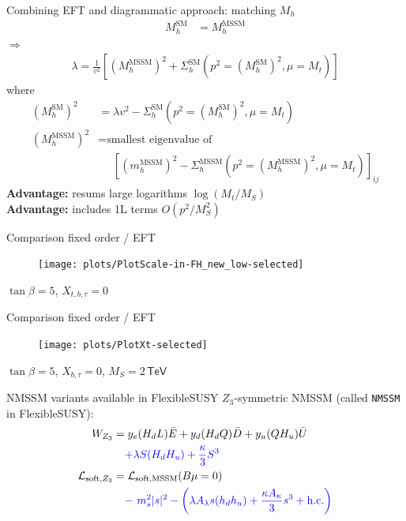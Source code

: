 \documentclass[hyperref={pdfpagelabels=false},ngerman]{beamer}
\newcommand{\eh}[1]{\,\mathsf{#1}}
\newcommand{\Lagr}{\mathcal{L}}
\renewcommand{\emph}{\textbf}
\newcommand{\SM}{\ensuremath{\text{SM}}}
\begin{document}
\begin{frame}{Combining EFT and diagrammatic approach: matching $M_h$}
  \begin{align*}
    M_h^{\SM} &= M_h^\text{MSSM}
  \end{align*}
  $\Rightarrow$
  \begin{align*}
    \lambda = \frac{1}{v^2} \left[ (M_h^\text{MSSM})^2 +
      \Sigma^\SM_h(p^2 = (M_h^\SM)^2,\mu = M_t) \right]
  \end{align*}
  where
  \begin{align*}
    (M_h^{\SM})^2 &= \lambda v^2 - \Sigma^{\SM}_h(p^2 = (M_h^{\SM})^2,\mu = M_t) \\
    (M_h^\text{MSSM})^2 &= \text{smallest eigenvalue of} \\
    &\phantom{={}} \left[(m_h^\text{MSSM})^2 - \Sigma^\text{MSSM}_h(p^2 = (M_h^\text{MSSM})^2,\mu = M_t)\right]_{ij}
  \end{align*}
  \emph{Advantage:} resums large logarithms $\log(M_t/M_S)$\\
  \emph{Advantage:} includes 1L terms $O(p^2/M_S^2)$
\end{frame}


\begin{frame}{Comparison fixed order / EFT}
  \begin{figure}
    \centering
    \texttt{[image: plots/PlotScale-in-FH\_new\_low-selected]}
  \end{figure}
  $\tan\beta = 5$, $X_{t,b,\tau} = 0$
\end{frame}


\begin{frame}{Comparison fixed order / EFT}
  \begin{figure}
    \centering
    \texttt{[image: plots/PlotXt-selected]}
  \end{figure}
  $\tan\beta = 5$, $X_{b,\tau} = 0$, $M_S = 2\eh{TeV}$
\end{frame}


\begin{frame}{NMSSM variants available in FlexibleSUSY}
  $Z_3$-symmetric NMSSM (called \texttt{NMSSM} in FlexibleSUSY):
  \begin{align*} 
    W_{Z_3} &= y_e (H_d L) \bar{E}
      + y_d (H_d Q) \bar{D}
      + y_u (Q H_u) \bar{U}\\
      &\phantom{={}}
      \textcolor{blue}{+ \lambda S (H_d H_u) + \frac{\kappa}{3}S^{3}} \\
    \Lagr_{\text{soft},Z_3} &= \Lagr_\text{soft,MSSM}(B\mu=0)\\
    &\phantom{={}}
    \textcolor{blue}{ -\ m_s^2|s|^2 
      -\left(\lambda A_\lambda s (h_d h_u)
        + \frac{\kappa A_\kappa}{3} s^3 + \text{h.c.}\right)}
  \end{align*}
\end{frame}
\end{document}
